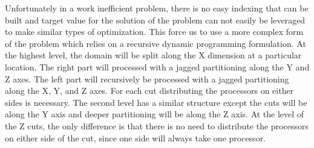 \documentclass[10pt, conference, compsocconf]{IEEEtran}
\begin{document}
Unfortunately in a work inefficient problem, there is no easy indexing
that can be built and target value for the solution of the problem can
not easily be leveraged to make similar types of optimization. This
force us to use a more complex form of the problem which relies on a
recursive dynamic programming formulation. At the highest level, the
domain will be split along the X dimension at a particular
location. The right part will processed with a jagged partitioning
along the Y and Z axes. The left part will recursively be processed
with a jagged partitioning along the X, Y, and Z axes. For each cut
distributing the processors on either sides is necessary. The second
level has a similar structure except the cuts will be along the Y axis
and deeper partitioning will be along the Z axis. At the level of the
Z cuts, the only difference is that there is no need to distribute the
processors on either side of the cut, since one side will always take
one processor. 
\end{document}
